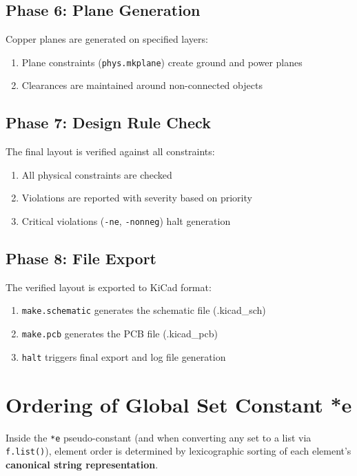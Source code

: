 \documentclass{report}
\begin{document}
\subsection{Phase 6: Plane Generation}
Copper planes are generated on specified layers:
\begin{enumerate}
\item Plane constraints (\texttt{phys.mkplane}) create ground and power planes
\item Clearances are maintained around non-connected objects
\end{enumerate}

\subsection{Phase 7: Design Rule Check}
The final layout is verified against all constraints:
\begin{enumerate}
\item All physical constraints are checked
\item Violations are reported with severity based on priority
\item Critical violations (\texttt{-ne}, \texttt{-nonneg}) halt generation
\end{enumerate}

\subsection{Phase 8: File Export}
The verified layout is exported to KiCad format:
\begin{enumerate}
\item \texttt{make.schematic} generates the schematic file (.kicad\_sch)
\item \texttt{make.pcb} generates the PCB file (.kicad\_pcb)
\item \texttt{halt} triggers final export and log file generation
\end{enumerate}

\section{Ordering of Global Set Constant *e}
Inside the \texttt{*e} pseudo-constant (and when converting any set to a list via \texttt{f.list()}), element order is determined by lexicographic sorting of each element's \textbf{canonical string representation}.
\end{document}
